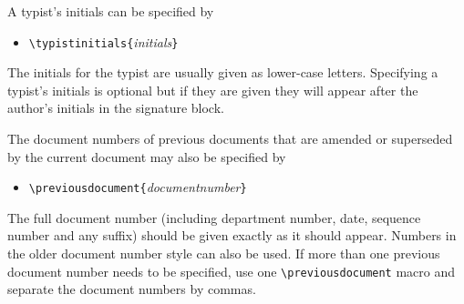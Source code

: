 A typist's initials can be specified by
\begin{itemize}
\item[]
\verb|\typistinitials{|{\it initials\/}\verb|}|
\end{itemize}
The initials for the typist are usually given as lower-case letters.
Specifying a typist's initials is optional but if they are given they
will appear after the author's initials in the signature block.

The document numbers of previous documents that are amended or
superseded by the current document may also be specified by
\begin{itemize}
\item[]
\verb|\previousdocument{|{\it documentnumber\/}\verb|}|
\end{itemize}
The full document number (including department number, date,
sequence number and any suffix) should be given exactly as it should
appear.  Numbers in the older document number style can also be
used.  If more than one previous document number needs to be
specified, use one \verb|\previousdocument| macro and separate
the document numbers by commas.

